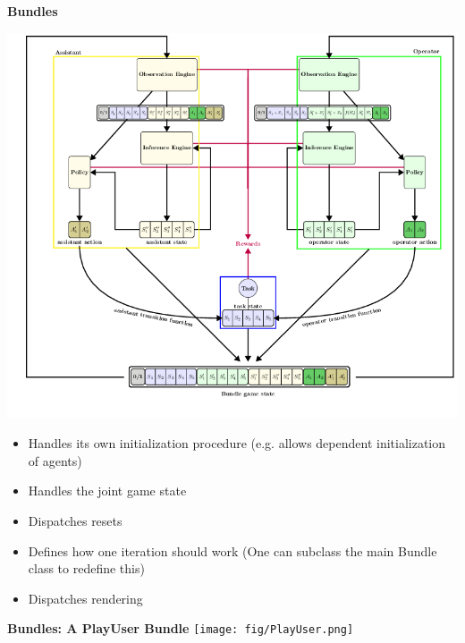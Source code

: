 \documentclass[11pt, xcolor = {dvipsnames}]{beamer}
\begin{document}
\begin{frame}{\textbf{Bundles}}

\begin{minipage}{.3\textwidth}
\includegraphics[width=\textwidth]{fig/bundle.png} 
\end{minipage}%
\begin{minipage}{.7\textwidth}
\begin{itemize}
\item Handles its own initialization procedure (e.g. allows dependent initialization of agents)
\item Handles the joint game state
\item Dispatches resets
\item Defines how one iteration should work (One can subclass the main Bundle class to redefine this)
\item Dispatches rendering
\end{itemize}
\end{minipage}
\end{frame}


\begin{frame}{\textbf{Bundles: A PlayUser Bundle}}
\centering
\texttt{[image: fig/PlayUser.png]} 
\end{frame}
\end{document}

